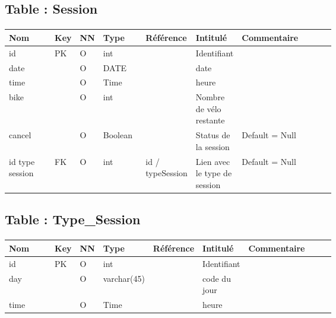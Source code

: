 	
	\subsection{Table : Session}
		\paragraph{}
			\begin{tabularx}{\linewidth}{|T{0.14\linewidth}|T{0.05\linewidth}|T{0.05\linewidth}|T{0.13\linewidth}|T{0.14\linewidth}|T{0.13\linewidth}|Y|}
				\hline
				Nom & Key & NN & Type & Référence & Intitulé & Commentaire \\
				\hline
				id & PK & O & int & & Identifiant & \\
				\hline
				date & & O & DATE & & date & \\
				\hline
				time & & O & Time & & heure & \\
				\hline
				bike & & O & int & & Nombre de vélo restante & \\
				\hline
				cancel & & O & Boolean & & Status de la session & Default = Null\\
				\hline
				id type session & FK & O & int & id / typeSession & Lien avec le type de session & Default = Null\\
				\hline
			\end{tabularx}
			
			
	\vspace{\baselineskip}
	\subsection{Table : Type\_Session}
		\paragraph{}
			\begin{tabularx}{\linewidth}{|T{0.14\linewidth}|T{0.05\linewidth}|T{0.05\linewidth}|T{0.13\linewidth}|T{0.14\linewidth}|T{0.13\linewidth}|Y|}
				\hline
				Nom & Key & NN & Type & Référence & Intitulé & Commentaire \\
				\hline
				id & PK & O & int & & Identifiant & \\
				\hline
				day & & O & varchar(45) & & code du jour & \\
				\hline
				time & & O & Time & & heure & \\
				\hline
			\end{tabularx}
			
			
	\vspace{\baselineskip}
